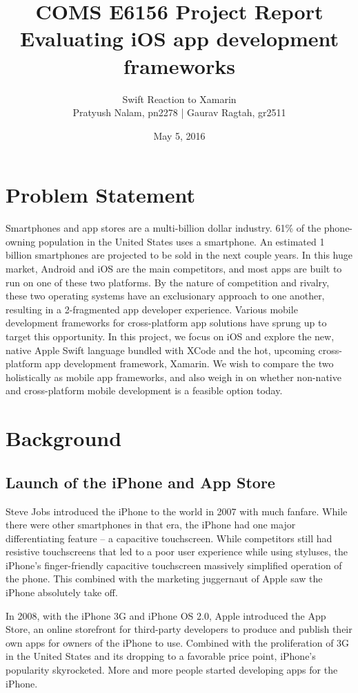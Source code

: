 \documentclass[12pt,a4paper]{article}
\title{COMS E6156 Project Report\\Evaluating iOS app development frameworks}
\author{Swift Reaction to Xamarin\\Pratyush Nalam, pn2278 | Gaurav Ragtah, gr2511}
\date{May 5, 2016}
\begin{document}
	\maketitle
	\thispagestyle{empty}
	
	\section{Problem Statement}
	
	Smartphones and app stores are a multi-billion dollar industry. 61\% of the phone-owning population in the United States uses a smartphone. An estimated 1 billion smartphones are projected to be sold in the next couple years. In this huge market, Android and iOS are the main competitors, and most apps are built to run on one of these two platforms. By the nature of competition and rivalry, these two operating systems have an exclusionary approach to one another, resulting in a 2-fragmented app developer experience. Various mobile development frameworks for cross-platform app solutions have sprung up to target this opportunity. In this project, we focus on iOS and explore the new, native Apple Swift language bundled with XCode and the hot, upcoming cross-platform app development framework, Xamarin. We wish to compare the two holistically as mobile app frameworks, and also weigh in on whether non-native and cross-platform mobile development is a feasible option today.
	
	\section{Background}
	
	\subsection{Launch of the iPhone and App Store}
	
	Steve Jobs introduced the iPhone to the world in 2007 with much fanfare. While there were other smartphones in that era, the iPhone had one major differentiating feature -- a capacitive touchscreen. While competitors still had resistive touchscreens that led to a poor user experience while using styluses, the iPhone's finger-friendly capacitive touchscreen massively simplified operation of the phone. This combined with the marketing juggernaut of Apple saw the iPhone absolutely take off.
	
	In 2008, with the iPhone 3G and iPhone OS 2.0, Apple introduced the App Store, an online storefront for third-party developers to produce and publish their own apps for owners of the iPhone to use. Combined with the proliferation of 3G in the United States and its dropping to a favorable price point, iPhone's popularity skyrocketed. More and more people started developing apps for the iPhone.
	
\end{document}

